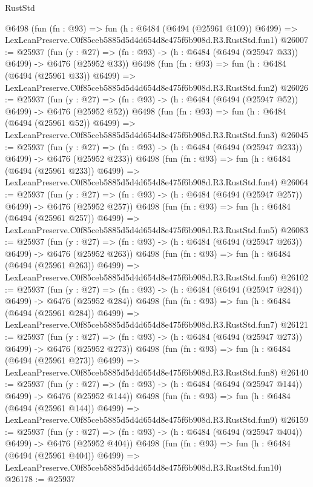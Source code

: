 \begin{lexlean}{RustStd}
\begin{coremodule}
    @6498
    (fun (fn : @93) =>
    fun (h : @6484 (@6494 (@25961 @109)) @6499) =>
    LexLeanPreserve.C0f85ceb5885d5d4d654d8e475f6b908d.R3.RustStd.fun1)
@26007 := @25937
    (fun (y : @27) => (fn : @93) -> (h : @6484 (@6494 (@25947 @33)) @6499) -> @6476 (@25952 @33))
    @6498
    (fun (fn : @93) =>
    fun (h : @6484 (@6494 (@25961 @33)) @6499) =>
    LexLeanPreserve.C0f85ceb5885d5d4d654d8e475f6b908d.R3.RustStd.fun2)
@26026 := @25937
    (fun (y : @27) => (fn : @93) -> (h : @6484 (@6494 (@25947 @52)) @6499) -> @6476 (@25952 @52))
    @6498
    (fun (fn : @93) =>
    fun (h : @6484 (@6494 (@25961 @52)) @6499) =>
    LexLeanPreserve.C0f85ceb5885d5d4d654d8e475f6b908d.R3.RustStd.fun3)
@26045 := @25937
    (fun (y : @27) => (fn : @93) -> (h : @6484 (@6494 (@25947 @233)) @6499) -> @6476 (@25952 @233))
    @6498
    (fun (fn : @93) =>
    fun (h : @6484 (@6494 (@25961 @233)) @6499) =>
    LexLeanPreserve.C0f85ceb5885d5d4d654d8e475f6b908d.R3.RustStd.fun4)
@26064 := @25937
    (fun (y : @27) => (fn : @93) -> (h : @6484 (@6494 (@25947 @257)) @6499) -> @6476 (@25952 @257))
    @6498
    (fun (fn : @93) =>
    fun (h : @6484 (@6494 (@25961 @257)) @6499) =>
    LexLeanPreserve.C0f85ceb5885d5d4d654d8e475f6b908d.R3.RustStd.fun5)
@26083 := @25937
    (fun (y : @27) => (fn : @93) -> (h : @6484 (@6494 (@25947 @263)) @6499) -> @6476 (@25952 @263))
    @6498
    (fun (fn : @93) =>
    fun (h : @6484 (@6494 (@25961 @263)) @6499) =>
    LexLeanPreserve.C0f85ceb5885d5d4d654d8e475f6b908d.R3.RustStd.fun6)
@26102 := @25937
    (fun (y : @27) => (fn : @93) -> (h : @6484 (@6494 (@25947 @284)) @6499) -> @6476 (@25952 @284))
    @6498
    (fun (fn : @93) =>
    fun (h : @6484 (@6494 (@25961 @284)) @6499) =>
    LexLeanPreserve.C0f85ceb5885d5d4d654d8e475f6b908d.R3.RustStd.fun7)
@26121 := @25937
    (fun (y : @27) => (fn : @93) -> (h : @6484 (@6494 (@25947 @273)) @6499) -> @6476 (@25952 @273))
    @6498
    (fun (fn : @93) =>
    fun (h : @6484 (@6494 (@25961 @273)) @6499) =>
    LexLeanPreserve.C0f85ceb5885d5d4d654d8e475f6b908d.R3.RustStd.fun8)
@26140 := @25937
    (fun (y : @27) => (fn : @93) -> (h : @6484 (@6494 (@25947 @144)) @6499) -> @6476 (@25952 @144))
    @6498
    (fun (fn : @93) =>
    fun (h : @6484 (@6494 (@25961 @144)) @6499) =>
    LexLeanPreserve.C0f85ceb5885d5d4d654d8e475f6b908d.R3.RustStd.fun9)
@26159 := @25937
    (fun (y : @27) => (fn : @93) -> (h : @6484 (@6494 (@25947 @404)) @6499) -> @6476 (@25952 @404))
    @6498
    (fun (fn : @93) =>
    fun (h : @6484 (@6494 (@25961 @404)) @6499) =>
    LexLeanPreserve.C0f85ceb5885d5d4d654d8e475f6b908d.R3.RustStd.fun10)
@26178 := @25937

\end{coremodule}
\end{lexlean}
